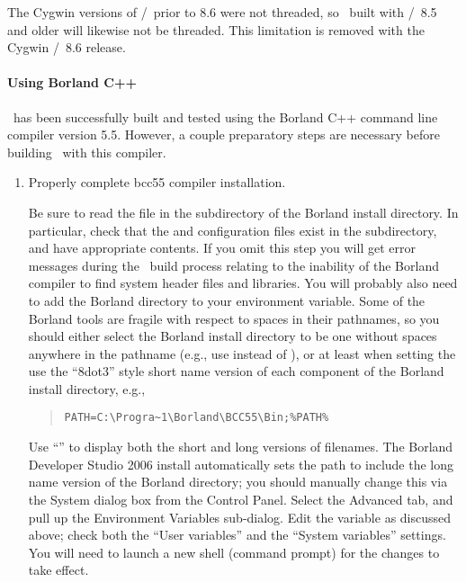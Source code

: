 The Cygwin versions of \Tcl/\Tk\ prior to 8.6 were not threaded, so
\OOMMF\ built with \Tcl/\Tk\ 8.5 and older will likewise not be
threaded.  This limitation is removed with the Cygwin \Tcl/\Tk\ 8.6
release.

\paragraph{Using Borland C++}
\OOMMF\ has been successfully built and tested using the
Borland C++ command line compiler version 5.5.
However, a couple preparatory steps are necessary before building
\OOMMF\ with this compiler.
\begin{enumerate}
\item Properly complete bcc55 compiler installation.

Be sure to read the  file in the 
subdirectory of the Borland install directory.  In particular, check
that the  and  configuration files exist
in the  subdirectory, and have appropriate contents.  If you
omit this step you will get error messages during the \OOMMF\ build
process relating to the inability of the Borland compiler to find
system header files and libraries.  You will probably also need to add
the Borland  directory to your  environment variable.
Some of the Borland tools are fragile with respect to spaces in their
pathnames, so you should either select the Borland install directory
to be one without spaces anywhere in the pathname (e.g., use
 instead of
), or at least when setting
the  use the ``8dot3'' style short name version of each
component of the Borland install directory, e.g.,
\begin{quote}
\begin{verbatim}
PATH=C:\Progra~1\Borland\BCC55\Bin;%PATH%
\end{verbatim}
\end{quote}
Use ``'' to display both the short and long versions of
filenames.  The Borland Developer Studio 2006 install automatically sets
the path to include the long name version of the Borland 
directory; you should manually change this via the System dialog box
from the Control Panel.  Select the Advanced tab, and pull up the
Environment Variables sub-dialog.  Edit the  variable as
discussed above; check both the ``User variables'' and the ``System
variables'' settings.  You will need to launch a new shell (command
prompt) for the changes to take effect.


\end{enumerate}
